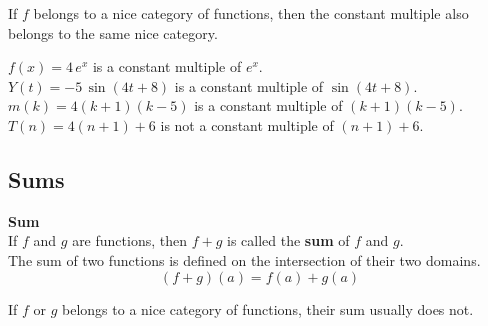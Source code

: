\documentclass{ximera}
\begin{document}
\begin{observation}

If $f$ belongs to a nice category of functions, then the constant multiple also belongs to the same nice category.

\end{observation}




\begin{example}

$f(x) = 4 \, e^x$ is a constant multiple of $e^x$. \\
$Y(t) = -5 \, \sin(4t + 8)$ is a constant multiple of $\sin(4t + 8)$. \\
$m(k) = 4 (k+1)(k-5)$ is a constant multiple of $(k+1)(k-5)$. \\


$T(n) = 4 (n+1) + 6$ is not a constant multiple of $(n+1) + 6$. \\

\end{example}


















\subsection*{Sums}


\begin{template}  \textbf{\textcolor{blue!55!black}{Sum}} \\


If  $f$ and $g$ are functions, then $f + g$ is called the \textbf{\textcolor{green!50!black}{sum}} of $f$ and $g$. \\

The sum of two functions is defined on the intersection of their two domains. \\


\[ (f + g)(a) = f(a) + g(a)  \]



\end{template}



\begin{warning}

If $f$ or $g$ belongs to a nice category of functions, their sum usually does not.

\end{warning}
\end{document}

